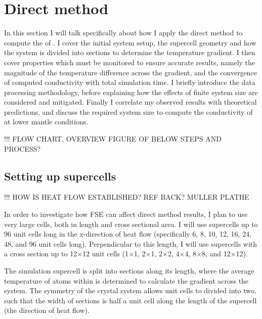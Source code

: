 \pagebreak


\section{\label{sec:3.direct}Direct method}

In this section I will talk specifically about how I apply the direct method to compute the \tcs of \bdg. I cover the initial system setup, the supercell geometry and how the system is divided into sections to determine the temperature gradient. I then cover properties which must be monitored to ensure accurate results, namely the magnitude of the temperature difference across the gradient, and the convergence of computed conductivity with total simulation time. I briefly introduce the data processing methodology, before explaining how the effects of finite system size are considered and mitigated. Finally I correlate my observed results with theoretical predictions, and discuss the required system size to compute the conductivity of \bdgs at lower mantle conditions.

!!! FLOW CHART, OVERVIEW FIGURE OF BELOW STEPS AND PROCESS?


\subsection{\label{sec:3.DM.cell}Setting up supercells}

!!! HOW IS HEAT FLOW ESTABLISHED? REF BACK? MULLER PLATHE

In order to investigate how FSE can affect direct method results, I plan to use very large cells, both in length and cross sectional area. I will use supercells up to 96 unit cells long in the x-direction of heat flow (specifically 6, 8, 10, 12, 16, 24, 48, and 96 unit cells long). Perpendicular to this length, I will use supercells with a cross section up to 12$\times$12 unit cells (1$\times$1, 2$\times$1, 2$\times$2, 4$\times$4, 8$\times$8, and 12$\times$12).

The simulation supercell is split into sections along its length, where the average temperature of atoms within is determined to calculate the gradient across the system. The symmetry of the \bdgs crystal system allows unit cells to divided into two, such that the width of sections is half a unit cell along the length of the supercell (the direction of heat flow). 

